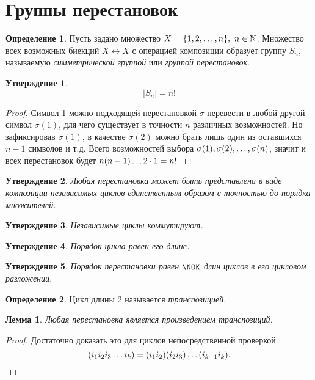 \documentclass[a4paper, 14pt]{extarticle}
\newcommand{\naturals}{\mathbb{N}}
\theoremstyle{definition}
\newtheorem{definition}{Определение}
\theoremstyle{plain}
\numberwithin{theorem}{section}
\numberwithin{definition}{section}
\newtheorem{statement}{Утверждение}
\numberwithin{statement}{section}
\newtheorem{lemma}{Лемма}
\numberwithin{lemma}{section}
\numberwithin{consequence}{section}
\begin{document}
	\section{Группы перестановок}
	\setcounter{definition}{0}
	\begin{definition}
		Пусть задано множество ${X = \{1, 2, \mathellipsis, n\}, \ n \in \naturals}$. Множество всех возможных биекций ${X \leftrightarrow X}$ с операцией композиции образует группу $S_n$, называемую \textit{симметрической группой} или \textit{группой перестановок}.
	\end{definition}
	\begin{statement}
		\begin{equation*}
			|S_n| = n!
		\end{equation*}
	\end{statement}
	\begin{proof}
		Символ 1 можно подходящей перестановкой $\sigma$ перевести в любой другой символ ${\sigma(1)}$, для чего существует в точности $n$ различных возможностей. Но зафиксировав ${\sigma(1)}$, в качестве ${\sigma(2)}$ можно брать лишь один из оставшихся ${n - 1}$ символов и т.д. Всего возможностей выбора ${\sigma(1), \sigma(2), \mathellipsis, \sigma(n)}$, значит и всех перестановок будет ${n(n - 1) \mathellipsis 2 \cdot 1 = n!.}$
	\end{proof}
	\begin{statement}
		Любая перестановка может быть представлена в виде композиции независимых циклов единственным образом с точностью до порядка множителей.
	\end{statement}
	\begin{statement}
		Независимые циклы коммутируют.
	\end{statement}
        \begin{statement}
		Порядок цикла равен его длине.
	\end{statement}
	\begin{statement}
		Порядок перестановки равен $\NOK$ длин циклов в его цикловом разложении.
	\end{statement}
        \begin{definition}
		Цикл длины 2 называется \textit{транспозицией}.
	\end{definition}
	\begin{lemma}
		Любая перестановка является произведением транспозиций.
	\end{lemma}
        \begin{proof}
            Достаточно доказать это для циклов непосредственной проверкой:
            \begin{equation*}
                (i_1 i_2 i_3 \mathellipsis i_k) = (i_1 i_2)(i_2 i_3)\mathellipsis(i_{k-1} i_k). \qedhere
            \end{equation*}
        \end{proof}
\end{document}
